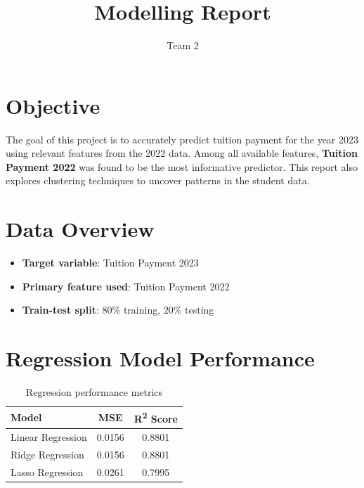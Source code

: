 \documentclass{article}
\title{Modelling Report}
\author{Team 2}
\date{}
\begin{document}
\maketitle

\section{Objective}
The goal of this project is to accurately predict tuition payment for the year 2023 using relevant features from the 2022 data. Among all available features, \textbf{Tuition Payment 2022} was found to be the most informative predictor. This report also explores clustering techniques to uncover patterns in the student data.

\section{Data Overview}
\begin{itemize}
    \item \textbf{Target variable}: Tuition Payment 2023
    \item \textbf{Primary feature used}: Tuition Payment 2022
    \item \textbf{Train-test split}: 80\% training, 20\% testing
\end{itemize}

\section{Regression Model Performance}
\begin{table}[H]
\centering
\begin{tabular}{lcc}
\toprule
\textbf{Model} & \textbf{MSE} & \textbf{R\textsuperscript{2} Score} \\
\midrule
Linear Regression & 0.0156 & 0.8801 \\
Ridge Regression & 0.0156 & 0.8801 \\
Lasso Regression & 0.0261 & 0.7995 \\
\bottomrule
\end{tabular}
\caption{Regression performance metrics}
\end{table}
\end{document}

